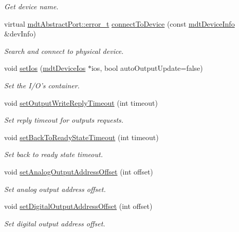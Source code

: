 \begin{DoxyCompactItemize}
\begin{DoxyCompactList}\small\item\em Get device name. \end{DoxyCompactList}\item 
virtual \hyperlink{classmdt_abstract_port_ad4121bb930c95887e77f8bafa065a85e}{mdtAbstractPort::error\_\-t} \hyperlink{classmdt_device_abab1b6e45af527880ce469ae318474c0}{connectToDevice} (const \hyperlink{classmdt_device_info}{mdtDeviceInfo} \&devInfo)
\begin{DoxyCompactList}\small\item\em Search and connect to physical device. \end{DoxyCompactList}\item 
void \hyperlink{classmdt_device_a9f1de62ef54974b0636dee673bd819e2}{setIos} (\hyperlink{classmdt_device_ios}{mdtDeviceIos} $\ast$ios, bool autoOutputUpdate=false)
\begin{DoxyCompactList}\small\item\em Set the I/O's container. \end{DoxyCompactList}\item 
void \hyperlink{classmdt_device_ad1f52eecd93931580b9ba88919f32509}{setOutputWriteReplyTimeout} (int timeout)
\begin{DoxyCompactList}\small\item\em Set reply timeout for outputs requests. \end{DoxyCompactList}\item 
void \hyperlink{classmdt_device_aa241c40514683254990e742cf1bbb155}{setBackToReadyStateTimeout} (int timeout)
\begin{DoxyCompactList}\small\item\em Set back to ready state timeout. \end{DoxyCompactList}\item 
void \hyperlink{classmdt_device_a3477278b4fa937f7667becb14333ef2f}{setAnalogOutputAddressOffset} (int offset)
\begin{DoxyCompactList}\small\item\em Set analog output address offset. \end{DoxyCompactList}\item 
void \hyperlink{classmdt_device_af5c2759221878a4d0306343f43e3cc45}{setDigitalOutputAddressOffset} (int offset)
\begin{DoxyCompactList}\small\item\em Set digital output address offset. \end{DoxyCompactList}\item 

\end{DoxyCompactItemize}
